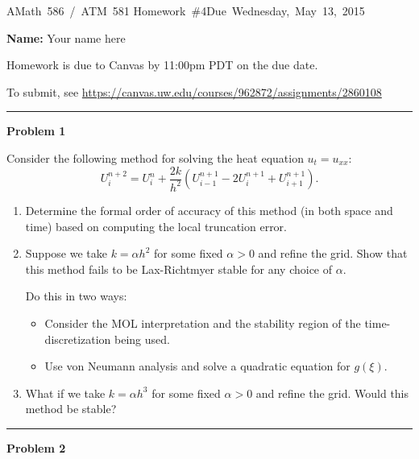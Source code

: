 \documentclass[10pt]{article}
\begin{document}
\hfill\vbox{\hbox{AMath 586 / ATM 581}
\hbox{Homework \#4}\hbox{Due Wednesday, May 13, 2015}}

{\bf Name:} Your name here
\vskip 5pt

Homework is due to Canvas by 11:00pm PDT on the due date.

To submit, see \url{https://canvas.uw.edu/courses/962872/assignments/2860108}


\vskip 1cm
\hrule
{\bf Problem 1}  


Consider the following method for solving the heat equation
$u_t=u_{xx}$:
\[
U_i^{n+2} = U_i^n + \frac{2k}{h^2}(U_{i-1}^{n+1} - 2U_i^{n+1} +
U_{i+1}^{n+1}).
\]
\begin{enumerate}
\item Determine the formal order of accuracy of this method 
(in both space and time) based on computing the local truncation error.

\item Suppose we take $k=\alpha h^2$ for some fixed $\alpha>0$ and refine
the grid.  Show that this method fails to be 
Lax-Richtmyer stable for any choice of $\alpha$.

Do this in two ways: 
\begin{itemize}
\item Consider the MOL interpretation and the stability region of
the time-discretization being used.
\item Use von Neumann analysis and solve a quadratic equation for $g(\xi)$.
\end{itemize} 

\item What if we take $k=\alpha h^3$ for some fixed $\alpha>0$ and refine
the grid. Would this method be stable?

\end{enumerate}




\vskip 1cm
\hrule
{\bf Problem 2}  
\end{document}
